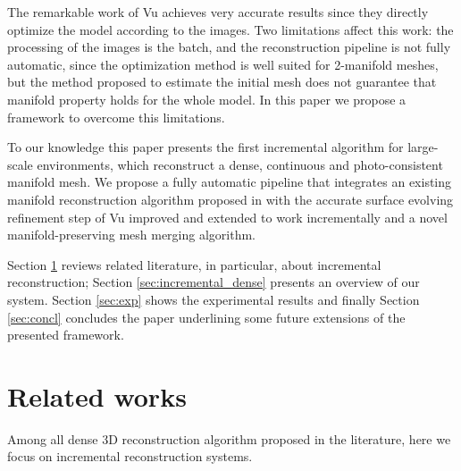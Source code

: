 \documentclass[times,10pt,twocolumn]{article}
\begin{document}
The remarkable work of Vu \etal \cite{vu_et_al_2012} achieves very accurate results since they directly optimize the model according to the images. 
Two limitations affect this work: the processing of the images is the batch, and the reconstruction pipeline is not fully automatic, since the optimization method is well suited for 2-manifold meshes, but the method proposed to estimate the initial mesh does not guarantee that manifold property holds for the whole model.
In this paper we propose a framework to overcome this  limitations.

To our knowledge this paper presents the first incremental algorithm for large-scale environments, which reconstruct a dense, continuous and photo-consistent manifold mesh. 
We propose a fully automatic pipeline that integrates an existing manifold reconstruction algorithm proposed in \cite{romanoni15a} with the accurate surface evolving refinement step of Vu \etal \cite{vu_et_al_2012} improved and extended to work incrementally and a novel manifold-preserving mesh merging algorithm.

Section \ref{sec:related_works} reviews related literature, in particular, about incremental reconstruction; Section \ref{sec:incremental_dense}  presents an overview of our system. 
Section \ref{sec:exp} shows the experimental results and finally Section \ref{sec:concl} concludes the paper underlining some future extensions of the presented framework.

\section{Related works}%
\label{sec:related_works}
Among all dense 3D reconstruction algorithm proposed in the literature, here we focus on incremental reconstruction systems. 
\end{document}
